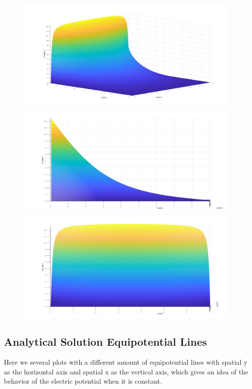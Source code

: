 \documentclass{amsart}
\begin{document}
\begin{figure}[H]
    \includegraphics[scale=0.22]{Asol1.jpg}
    \includegraphics[scale=0.18]{Asol2.jpg}  
     \includegraphics[scale=0.2]{Asol3.jpg}  
\end{figure}


 \subsection{Analytical Solution Equipotential Lines}
Here we several plots with a different amount of equipotential lines with spatial y as the horizontal axis and spatial x as the vertical axis, which gives an idea of the behavior of the electric potential when it is constant.\\\\
\end{document}
